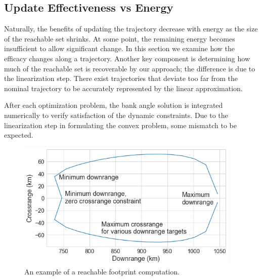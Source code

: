 \documentclass[letterpaper, preprint, paper,11pt]{AAS}	%
\begin{document}
	
	\subsection{Update Effectiveness vs Energy} \label{Section Reachable Set Analysis}
	Naturally, the benefits of updating the trajectory decrease with energy as the size of the reachable set shrinks. At some point, the remaining energy becomes insufficient to allow significant change. In this section we examine how the efficacy changes along a trajectory. Another key component is determining how much of the reachable set is recoverable by our approach; the difference is due to the linearization step. There exist trajectories that deviate too far from the nominal trajectory to be accurately represented by the linear approximation.  
	
	After each optimization problem, the bank angle solution is integrated numerically to verify satisfaction of the dynamic constraints. Due to the linearization step in formulating the convex problem, some mismatch to be expected. 
	
			\begin{figure}
				\centering
				\includegraphics[width=0.95\textwidth,keepaspectratio=true]{reachable_set}
				\caption{An example of a reachable footprint computation.}				
				\label{plot_RS_example}
			\end{figure}
	
\end{document}
